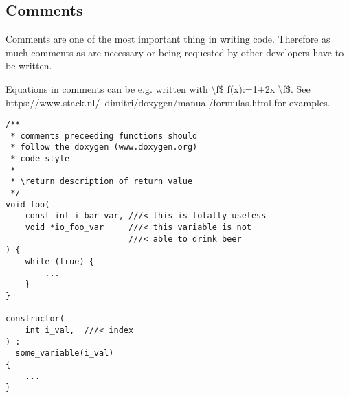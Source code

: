 \documentclass[10pt,a4paper]{article}
\begin{document}
\subsection{Comments}
Comments are one of the most important thing in writing code.
Therefore as much comments as are necessary or being requested by other developers have to be written.

Equations in comments can be e.g. written with  {\textbackslash}f\$ f(x):=1+2x {\textbackslash}f\$.
See https://www.stack.nl/~dimitri/doxygen/manual/formulas.html for examples.



\begin{lstlisting}
/**
 * comments preceeding functions should
 * follow the doxygen (www.doxygen.org)
 * code-style
 *
 * \return description of return value 
 */
void foo(
    const int i_bar_var, ///< this is totally useless
    void *io_foo_var     ///< this variable is not
                         ///< able to drink beer
) {
    while (true) {
        ...
    }
}

constructor(
    int i_val,	///< index
) :
  some_variable(i_val)
{
	...
}
\end{lstlisting}
\end{document}
